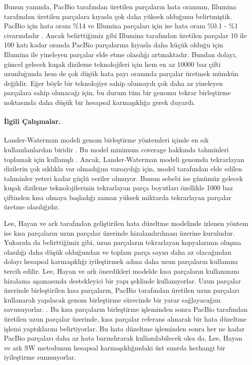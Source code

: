 Bunun yanında, PacBio tarafından üretilen parçaların hata oranının, Illumina tarafından üretilen parçalara kıyasla çok daha yüksek olduğunu belirtmiştik. PacBio için hata oranı \%14 ve Illumina parçaları için ise hata oranı \%0.1 - \%1 civarındadır \cite{Lou2013}. Ancak belirttiğimiz gibi Illumina tarafından üretilen parçalar 10 ile 100 katı kadar oranda PacBio parçalarına kıyasla daha küçük olduğu için Illumina ile yineleyen parçalar elde etme olasılığı artmaktadır. Bundan dolayı, güncel gelecek kuşak dizileme teknolojileri için hem en az 10000 baz çifti uzunluğunda hem de çok düşük hata payı oranında parçalar üretmek mümkün değildir. Eğer böyle bir teknolojiye sahip olunsaydı çok daha az yineleyen parçalara sahip olunacağı için, bu durum tüm bir genomu tekrar birleştirme noktasında daha düşük bir hesapsal karmaşıklığa gerek duyardı. 

\paragraph{İlgili Çalışmalar.}

Lander-Waterman modeli genom birleştirme yöntemleri içinde en sık kullanılanlardan biridir \cite{Lander1988}. Bu model minimum coverage hakkında tahminleri toplamak için kullanışlı \cite{Lee2014}. Ancak, Lander-Waterman modeli genomda tekrarlayan dizilerin çok sıklıkla var olmadığını varsaydığı için, model tarafından elde edilen tahminler yeteri kadar güçlü veriler olmuyor. Bunun sebebi ise günümüz gelecek kuşak dizileme teknolojilerinin tekrarlayan parça boyutları özellikle 1000 baz çiftinden kısa olmaya başladığı zaman yüksek miktarda tekrarlayan parçalar üretme olasılığıdır.

Lee, Hayan ve ark \cite{Lee2014} tarafından geliştirilen hata düzeltme modelinde izlenen yöntem ise kısa parçaların uzun parçalar üzerinde hizalandırılması üzerine kuruludur. Yukarıda da belirttiğimiz gibi, uzun parçaların tekrarlayan kopyalarının oluşma olasılığı daha düşük olduğundan ve toplam parça sayısı daha az olacağından dolayı hesapsal karmaşıklığı iyileştirmek adına daha uzun parçaların kullanımı tercih edilir. Lee, Hayan ve ark önerdikleri modelde kısa parçaların kullanımını hizalama aşamasında destekleyici bir yapı şeklinde kullanıyorlar. Uzun parçalar üzerinde birleştirilen kısa parçaların, PacBio tarafından üretilen uzun parçaları kullanarak yapılacak genom birleştirme sürecinde bir yarar sağlayacağını savunuyorlar. \cite{Lee2014}. Bu kısa parçaların birleştirme işleminden sonra PacBio tarafından üretilen uzun parçalar üzerinde, kısa parçalar referans alınarak bir hata düzeltme işlemi yaptıklarını belirtiyorlar. Bu hata düzeltme işleminden sonra her ne kadar PacBio parçaları daha az hata barındırarak kullanılabilecek olsa da, Lee, Hayan ve ark SW metodunun hesapsal karmaşıklığındaki üst sınırda herhangi bir iyileştirme sunmuyorlar.

